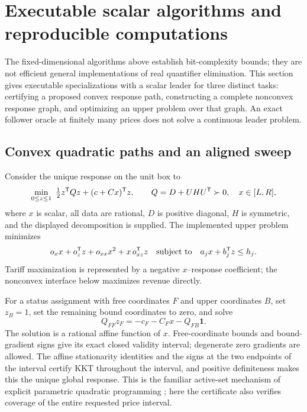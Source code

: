 \section{Executable scalar algorithms and reproducible computations}
\label{sec:computation}

The fixed-dimensional algorithms above establish bit-complexity bounds; they
are not efficient general implementations of real quantifier elimination.
This section
gives executable specializations with a scalar leader for three distinct
tasks: certifying a proposed convex response path, constructing a complete
nonconvex response graph, and optimizing an upper problem over that graph.
An exact follower oracle at finitely many prices does not solve a continuous
leader problem.

\subsection{Convex quadratic paths and an aligned sweep}
\label{subsec:convex-implementation}
Consider the unique response on the unit box to
\begin{equation}\label{eq:implemented-convex}
 \min_{0\le z\le1}\ \tfrac12z^{\mathsf T} Qz+(c+Cx)^{\mathsf T} z,
 \qquad Q=D+UHU^{\mathsf T}\succ0,\quad x\in[L,R],
\end{equation}
where $x$ is scalar, all data are rational, $D$ is positive diagonal, $H$ is
symmetric, and the displayed decomposition is supplied. The implemented upper
problem minimizes
\begin{equation}\label{eq:implemented-upper}
 o_xx+o_z^{\mathsf T} z+o_{xx}x^2+x\,o_{xz}^{\mathsf T} z
 \quad\text{subject to}\quad a_jx+b_j^{\mathsf T} z\le h_j.
\end{equation}
Tariff maximization is represented by a negative $x$--response coefficient;
the nonconvex interface below maximizes revenue directly.

For a status assignment with free coordinates $F$ and upper coordinates $B$,
set $z_B=1$, set the remaining bound coordinates to zero, and solve
\[
 Q_{FF}z_F=-c_F-C_Fx-Q_{FB}\mathbf1.
\]
The solution is a rational affine function of $x$. Free-coordinate bounds and
bound-gradient signs give its exact closed validity interval; degenerate zero
gradients are allowed. The affine stationarity identities and the signs at the
two endpoints of the interval certify KKT throughout the interval, and positive
definiteness makes this the unique global response. This is the familiar
active-set mechanism of explicit parametric quadratic programming
\citep[Theorems 2 and 4]{BemporadEtAl2002}; here the certificate also verifies
coverage of the entire requested price interval.

